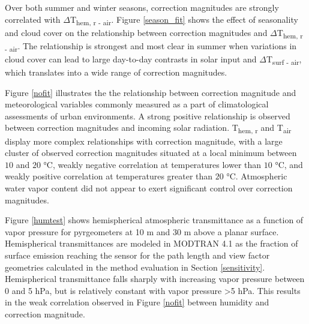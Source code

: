 Over both summer and winter seasons, correction magnitudes are strongly correlated with $\Delta$T\textsubscript{hem, r - air}. Figure \ref{season_fit} shows the effect of seasonality and cloud cover on the relationship between correction magnitudes and $\Delta$T\textsubscript{hem, r - air}. The relationship is strongest and most clear in summer when variations in cloud cover can lead to large day-to-day contrasts in solar input and $\Delta$T\textsubscript{surf - air}, which translates into a wide range of correction magnitudes.

Figure \ref{nofit} illustrates the the relationship between correction magnitude and meteorological variables commonly measured as a part of climatological assessments of urban environments. A strong positive relationship is observed between correction magnitudes and incoming solar radiation. T\textsubscript{hem, r} and T\textsubscript{air} display more complex relationships with correction magnitude, with a large cluster of observed correction magnitudes situated at a local minimum between $10$ and $20$ \si{\degreeCelsius}, weakly negative correlation at temperatures lower than $10$ \si{\degreeCelsius}, and weakly positive correlation at temperatures greater than $20$ \si{\degreeCelsius}. Atmospheric water vapor content did not appear to exert significant control over correction magnitudes.

Figure \ref{humtest} shows hemispherical atmospheric transmittance as a function of vapor pressure for pyrgeometers at 10 \si{\meter} and 30 \si{\meter} above a planar surface. Hemispherical transmittances are modeled in MODTRAN 4.1 as the fraction of surface emission reaching the sensor for the path length and view factor geometries calculated in the method evaluation in Section \ref{sensitivity}. Hemispherical transmittance falls sharply with increasing vapor pressure between 0 and 5 \si{\hecto\pascal}, but is relatively constant with vapor pressure \textgreater 5 \si{\hecto\pascal}. This results in the weak correlation observed in Figure \ref{nofit} between humidity and correction magnitude.


